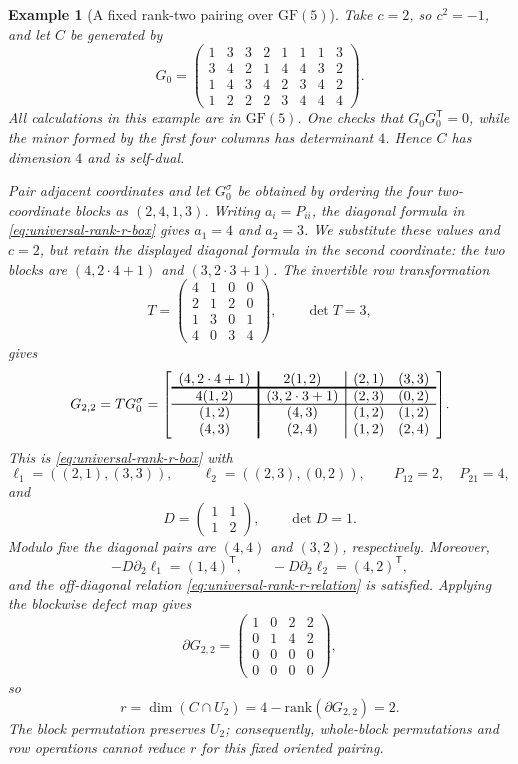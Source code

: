 \documentclass[12pt]{article}
\newtheorem{example}{Example}[section]
\newcommand{\GF}[1]{\ensuremath{\mathrm{GF}(#1)}}
\newcommand{\rank}{\mathrm{rank}}
\begin{document}
\begin{example}[A fixed rank-two pairing over \(\GF{5}\)]
\label{ex:rank-two-gf5}
\rm
Take \(c=2\), so \(c^2=-1\), and let \(C\) be generated by
\[
G_0=\begin{pmatrix}
1&3&3&2&1&1&1&3\\
3&4&2&1&4&4&3&2\\
1&4&3&4&2&3&4&2\\
1&2&2&2&3&4&4&4
\end{pmatrix}.
\]
All calculations in this example are in \(\GF{5}\). One checks that
\(G_0G_0^{\mathsf T}=0\), while the minor formed by the first four columns
has determinant \(4\). Hence \(C\) has dimension \(4\) and is self-dual.

Pair adjacent coordinates and let \(G_0^\sigma\) be obtained by ordering the
four two-coordinate blocks as \((2,4,1,3)\). Writing
\(a_i=P_{ii}\), the diagonal formula in
\eqref{eq:universal-rank-r-box} gives \(a_1=4\) and \(a_2=3\). We
substitute these values and \(c=2\), but retain the displayed diagonal
formula in the second coordinate: the two blocks are
\((4,2\cdot4+1)\) and \((3,2\cdot3+1)\). The invertible row transformation
\[
T=\begin{pmatrix}
4&1&0&0\\
2&1&2&0\\
1&3&0&1\\
4&0&3&4
\end{pmatrix},\qquad \det T=3,
\]
gives
\[
G_{2,2}=TG_0^\sigma=
{\arrayrulewidth=1.2pt
\left[\begin{array}{c!{\vrule width 1.2pt}c!{\vrule width 0.6pt}cc}
(4,2\cdot4+1)&\multicolumn{1}{c!{\vrule width 0.6pt}}{2(1,2)}&(2,1)&(3,3)\\[-1pt]
\noalign{\hrule height 1.2pt}
4(1,2)&(3,2\cdot3+1)&(2,3)&(0,2)\\[-1pt]
\noalign{\hrule height 0.6pt}
(1,2)&(4,3)&(1,2)&(1,2)\\
(4,3)&(2,4)&(1,2)&(2,4)
\end{array}\right]}.
\]
This is \eqref{eq:universal-rank-r-box} with
\[
\ell_1=((2,1),(3,3)),\qquad
\ell_2=((2,3),(0,2)),\qquad
P_{12}=2,\quad P_{21}=4,
\]
and
\[
D=\begin{pmatrix}1&1\\1&2\end{pmatrix},\qquad \det D=1.
\]
Modulo five the diagonal pairs are \((4,4)\) and \((3,2)\), respectively.
Moreover,
\[
-D\partial_2\ell_1=(1,4)^{\mathsf T},\qquad
-D\partial_2\ell_2=(4,2)^{\mathsf T},
\]
and the off-diagonal relation
\eqref{eq:universal-rank-r-relation} is satisfied. Applying the blockwise
defect map gives
\[
\partial G_{2,2}=
\begin{pmatrix}
1&0&2&2\\
0&1&4&2\\
0&0&0&0\\
0&0&0&0
\end{pmatrix},
\]
so
\[
r=\dim(C\cap U_2)=4-\rank(\partial G_{2,2})=2.
\]
The block permutation preserves \(U_2\); consequently, whole-block
permutations and row operations cannot reduce \(r\) for this fixed oriented
pairing.


\end{example}
\end{document}
